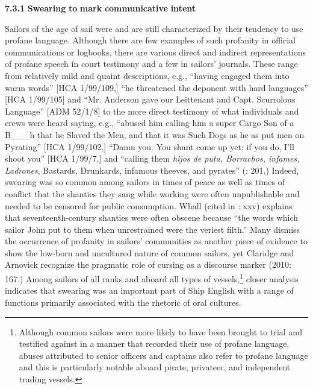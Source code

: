   \textbf{7.3.1} \textbf{Swearing} \textbf{to} \textbf{mark} \textbf{communicative} \textbf{intent}

  Sailors of the age of sail were and are still characterized by their tendency to use profane language. Although there are few examples of such profanity in official communications or logbooks, there are various direct and indirect representations of profane speech in court testimony and a few in sailors’ journals. These range from relatively mild and quaint descriptions, e.g., “having engaged them into warm words” [HCA 1/99/109,] “he threatened the deponent with hard languages” [HCA 1/99/105] and “Mr. Anderson gave our Leittenant and Capt. Scurrolous Language” [ADM 52/1/8] to the more direct testimony of what individuals and crews were heard saying, e.g., “abused him calling him a super Cargo Son of a B\_\_\_h that he Slaved the Men, and that it was Such Dogs as he as put men on Pyrating” [HCA 1/99/102,] “Damn you. You shant come up yet; if you do, I’ll shoot you” [HCA 1/99/7,] and “calling them \textit{hijos de puta, Borrachos, infames, Ladrones}, Bastards, Drunkards, infamous theeves, and pyrates” (\citealt{Gage1648}: 201.) Indeed, swearing was so common among sailors in times of peace as well as times of conflict that the shanties they sang while working were often unpublishable and needed to be censored for public consumption. Whall (cited in \citealt{Palmer1986}: xxv) explains that seventeenth-century shanties were often obscene because “the words which sailor John put to them when unrestrained were the veriest filth.” Many dismiss the occurrence of profanity in sailors’ communities as another piece of evidence to show the low-born and uncultured nature of common sailors, yet Claridge and Arnovick recognize the pragmatic role of cursing as a discourse marker (2010: 167.) Among sailors of all ranks and aboard all types of vessels,\footnote{Although common sailors were more likely to have been brought to trial and testified against in a manner that recorded their use of profane language, abuses attributed to senior officers and captains also refer to profane language and this is particularly notable aboard pirate, privateer, and independent trading vessels.} closer analysis indicates that swearing was an important part of Ship English with a range of functions primarily associated with the rhetoric of oral cultures.

